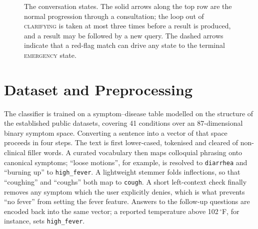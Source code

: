 \documentclass[conference]{IEEEtran}
\newcommand{\degF}{$^{\circ}$F}
\newcommand{\code}[1]{\texttt{\small #1}}
\begin{document}
\begin{figure}[tb]
\centering
{}
\caption{The conversation states. The solid arrows along the top row are the
normal progression through a consultation; the loop out of
\textsc{clarifying} is taken at most three times before a result is produced,
and a result may be followed by a new query. The dashed arrows indicate that
a red-flag match can drive any state to the terminal \textsc{emergency}
state.}
\label{fig:fsm}
\end{figure}

\section{Dataset and Preprocessing}

The classifier is trained on a symptom--disease table modelled on the
structure of the established public datasets, covering 41 conditions over an
87-dimensional binary symptom space. Converting a sentence into a vector of
that space proceeds in four steps. The text is first lower-cased, tokenised
and cleared of non-clinical filler words. A curated vocabulary then maps
colloquial phrasing onto canonical symptoms; ``loose motions'', for example,
is resolved to \code{diarrhea} and ``burning up'' to \code{high\_fever}. A
lightweight stemmer folds inflections, so that ``coughing'' and ``coughs''
both map to \code{cough}. A short left-context check finally removes any
symptom which the user explicitly denies, which is what prevents ``no fever''
from setting the fever feature. Answers to the follow-up questions are
encoded back into the same vector; a reported temperature above 102\,\degF,
for instance, sets \code{high\_fever}.
\end{document}

